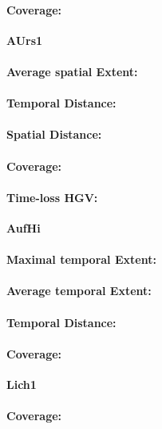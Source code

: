 \paragraph{Coverage:}

\large
\centerline{\textbf{AUrs1}}
\normalsize

\paragraph{Average spatial Extent:}
\paragraph{Temporal Distance:}
\paragraph{Spatial Distance:}
\paragraph{Coverage:}
\paragraph{Time-loss HGV:}

\large
\centerline{\textbf{AufHi}}
\normalsize

\paragraph{Maximal temporal Extent:}
\paragraph{Average temporal Extent:}
\paragraph{Temporal Distance:}
\paragraph{Coverage:}

\large
\centerline{\textbf{Lich1}}
\normalsize

\paragraph{Coverage:}

